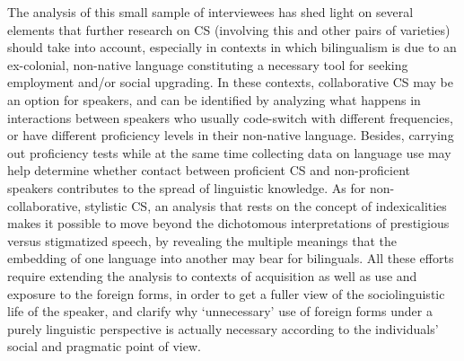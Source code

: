 \documentclass[output=paper]{langscibook}
\begin{document}
The analysis of this small sample of interviewees has shed light on several elements that further research on \gls*{CS} (involving this and other pairs of varieties) should take into account, especially in contexts in which bilingualism is due to an ex-colonial, non-native language constituting a necessary tool for seeking employment and/or social upgrading. In these contexts, collaborative \gls*{CS} may be an option for speakers, and can be identified by analyzing what happens in interactions between speakers who usually code-switch with different frequencies, or have different proficiency levels in their non-native language. Besides, carrying out proficiency tests while at the same time collecting data on language use may help determine whether contact between proficient \gls*{CS} and non-proficient speakers contributes to the spread of linguistic knowledge. As for non-collaborative, stylistic \gls*{CS}, an analysis that rests on the concept of indexicalities makes it possible to move beyond the dichotomous interpretations of prestigious versus stigmatized speech, by revealing the multiple meanings that the embedding of one language into another may bear for bilinguals.  All these efforts require extending the analysis to contexts of acquisition as well as use and exposure to the foreign forms, in order to get a fuller view of the sociolinguistic life of the speaker, and clarify why ‘unnecessary' use of foreign forms under a purely linguistic perspective is actually necessary according to the individuals’ social and pragmatic point of view.
\end{document}
